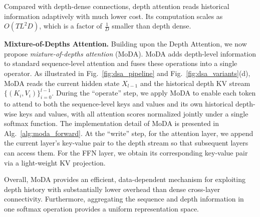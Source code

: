 \documentclass[]{bytedance_seed}
\newcommand{\myPara}[1]{\vspace{.05in}\noindent\textbf{#1.}}
\newcommand{\name}{MoDA}
\begin{document}
Compared with depth-dense connections, depth attention reads historical information adaptively with much lower cost.
Its computation scales as $O(TL^2D)$, which is a factor of $\frac{1}{D}$ smaller than depth dense.

\myPara{Mixture-of-Depths Attention}
Building upon the Depth Attention, we now propose \emph{mixture-of-depths attention} (\name{}).
\name{} adds depth-level information to standard sequence-level attention and fuses these operations into a single operator.
As illustrated in Fig.~\ref{fig:dsa_pipeline} and Fig.~\ref{fig:dsa_variants}(d), \name{} reads the current hidden state $X_{l-1}$ and the historical depth KV stream $\{(K_i, V_i)\}_{i=0}^{l-1}$.
During the ``operate'' step, we apply \name{} to enable each token to attend to both the sequence-level keys and values and its own historical depth-wise keys and values, with all attention scores normalized jointly under a single softmax function.
The implementation detail of \name{} is presented in Alg.~\ref{alg:moda_forward}.
At the ``write'' step, for the attention layer, we append the current layer's key-value pair to the depth stream so that subsequent layers can access them.
For the FFN layer, we obtain its corresponding key-value pair via a light-weight KV projection.

Overall, \name{} provides an efficient, data-dependent mechanism for exploiting depth history with substantially lower overhead than dense cross-layer connectivity.
Furthermore, aggregating the sequence and depth information in one softmax operation provides a uniform representation space.
\end{document}
